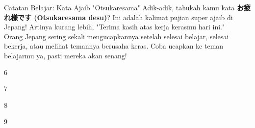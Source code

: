 \begin{lessonbox}{Catatan Belajar: Kata Ajaib "Otsukaresama"}
    Adik-adik, tahukah kamu kata \textbf{お疲れ様です (Otsukaresama desu)}? Ini adalah kalimat pujian super ajaib di Jepang! Artinya kurang lebih, "Terima kasih atas kerja kerasmu hari ini." \\
    
    Orang Jepang sering sekali mengucapkannya setelah selesai belajar, selesai bekerja, atau melihat temannya berusaha keras. Coba ucapkan ke teman belajarmu ya, pasti mereka akan senang!
\end{lessonbox}

\begin{convobox}{6}
    \noindent
     

    \vspace{1.5em}
\end{convobox}

\begin{convobox}{7}
    \noindent
     

    \vspace{1.5em}
\end{convobox}

\begin{convobox}{8}
    \noindent
     

    \vspace{1.5em}
\end{convobox}

\begin{convobox}{9}
    \noindent
      
     

    \vspace{1.5em}
\end{convobox}


